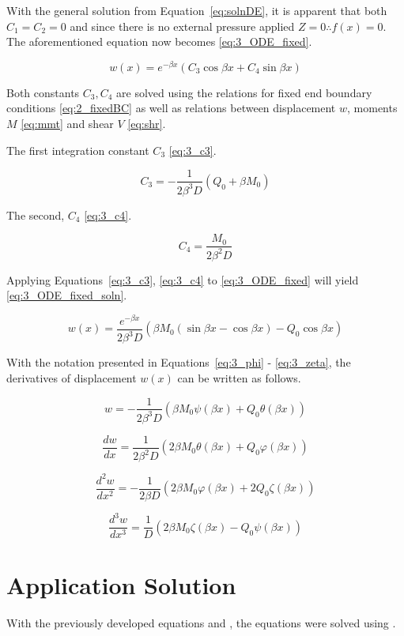 With the general solution from Equation~\ref{eq:solnDE}, it is apparent that both $C_1=C_2=0$ and since there is no external pressure applied $Z=0 \therefore f(x) = 0$. The aforementioned equation now becomes \ref{eq:3_ODE_fixed}.

\begin{equation}
	\label{eq:3_ODE_fixed}
	w(x)=e^{-\beta x} \left(C_3 \cos \beta x +C_4 \sin \beta x \right)
\end{equation}


Both constants $C_3, C_4$ are solved using the relations for fixed end boundary conditions \ref{eq:2_fixedBC} as well as relations between displacement $w$, moments $M$ \ref{eq:mmt} and shear $V$ \ref{eq:shr}.


The first integration constant $C_3$ \ref{eq:3_c3}.

\begin{equation}
	\label{eq:3_c3}
	C_3 = - \frac{1}{2 \beta^3 D} \left( Q_0 + \beta M_0 \right)
\end{equation}

The second, $C_4$ \ref{eq:3_c4}.

\begin{equation}
	\label{eq:3_c4}
	C_4 = \frac{M_0}{2 \beta^2 D}
\end{equation}


Applying Equations~\ref{eq:3_c3}, \ref{eq:3_c4} to \ref{eq:3_ODE_fixed} will yield \ref{eq:3_ODE_fixed_soln}.

\begin{equation}
	\label{eq:3_ODE_fixed_soln}
	w(x)= \frac{e^{-\beta x}}{2 \beta^3 D} \left( \beta M_0 (\sin \beta x -\cos \beta x) - Q_0 \cos \beta x  \right)
\end{equation}

With the notation presented in Equations~\ref{eq:3_phi} - \ref{eq:3_zeta}, the derivatives of displacement $w(x)$ can be written as follows.

\begin{equation}
	\label{eq:3_w0}
	w = - \frac{1}{2 \beta^3 D} \left( \beta M_0 \psi(\beta x) + Q_0 \theta (\beta x) \right)
\end{equation}

\begin{equation}
	\label{eq:3_w1}
	\frac{dw}{dx} = \frac{1}{2 \beta^2 D} \left( 2 \beta M_0 \theta(\beta x) + Q_0 \varphi(\beta x) \right)	
\end{equation}

\begin{equation}
	\label{eq:3_w2}
	\frac{d^2w}{dx^2} = - \frac{1}{2 \beta D} \left( 2 \beta M_0 \varphi(\beta x) + 2 Q_0 \zeta(\beta x) \right)
\end{equation}

\begin{equation}
	\label{eq:3_w3}
	\frac{d^3w}{dx^3} = \frac{1}{D} \left( 2 \beta M_0 \zeta(\beta x) - Q_0 \psi(\beta x) \right)
\end{equation}


\section{Application Solution}

With the previously developed equations and \cite{roarks}, the equations were solved using \cite{EXCEL}.
